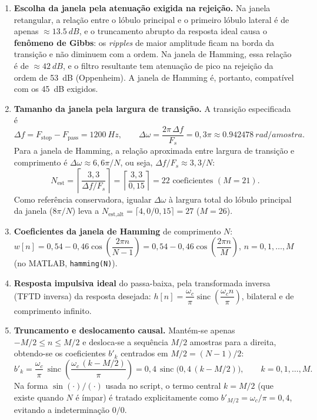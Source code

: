 \documentclass[11pt,a4paper]{article}
\newcommand{\sinc}{\operatorname{sinc}}
\begin{document}
\begin{enumerate}[leftmargin=1.6em, itemsep=2pt, topsep=3pt]
    \item \textbf{Escolha da janela pela atenuação exigida na rejeição.} Na janela retangular, a relação entre o lóbulo principal e o primeiro lóbulo lateral é de apenas $\approx\SI{13,5}{dB}$, e o truncamento abrupto da resposta ideal causa o \textbf{fenômeno de Gibbs}: os \textit{ripples} de maior amplitude ficam na borda da transição e não diminuem com a ordem. Na janela de Hamming, essa relação é de $\approx\SI{42}{dB}$, e o filtro resultante tem atenuação de pico na rejeição da ordem de \SI{53}{dB} (Oppenheim). A janela de Hamming é, portanto, compatível com os \SI{45}{dB} exigidos.

    \item \textbf{Tamanho da janela pela largura de transição.} A transição especificada é
    \begin{equation}
        \Delta f = F_{\text{stop}} - F_{\text{pass}} = \SI{1200}{Hz}, \qquad \Delta\omega = \frac{2\pi\,\Delta f}{F_s} = 0,3\pi \approx \SI{0,942478}{rad/amostra}.
    \end{equation}
    Para a janela de Hamming, a relação aproximada entre largura de transição e comprimento é $\Delta\omega \approx 6,6\pi/N$, ou seja, $\Delta f/F_s \approx 3,3/N$:
    \begin{equation}
        N_{\text{est}} = \left\lceil \frac{3,3}{\Delta f / F_s} \right\rceil = \left\lceil \frac{3,3}{0,15} \right\rceil = 22 \text{ coeficientes } (M = 21).
    \end{equation}
    Como referência conservadora, igualar $\Delta\omega$ à largura total do lóbulo principal da janela ($8\pi/N$) leva a $N_{\text{est,alt}} = \lceil 4,0/0,15 \rceil = 27$ ($M = 26$).

    \item \textbf{Coeficientes da janela de Hamming} de comprimento $N$: $w[n] = 0,54 - 0,46\cos\!\left(\dfrac{2\pi n}{N-1}\right) = 0,54 - 0,46\cos\!\left(\dfrac{2\pi n}{M}\right)$, $n = 0, 1, \dots, M$ (no MATLAB, \texttt{hamming(N)}).

    \item \textbf{Resposta impulsiva ideal} do passa-baixa, pela transformada inversa (TFTD inversa) da resposta desejada: $h[n] = \dfrac{\omega_c}{\pi}\sinc\!\left(\dfrac{\omega_c n}{\pi}\right)$, bilateral e de comprimento infinito.

    \item[5--6.] \textbf{Truncamento e deslocamento causal.} Mantém-se apenas $-M/2 \le n \le M/2$ e desloca-se a sequência $M/2$ amostras para a direita, obtendo-se os coeficientes $b'_k$ centrados em $M/2 = (N-1)/2$:
    \begin{equation}
        b'_k = \frac{\omega_c}{\pi}\,\sinc\!\left(\frac{\omega_c\,(k - M/2)}{\pi}\right) = 0,4\,\sinc\big(0,4\,(k - M/2)\big), \qquad k = 0, 1, \dots, M.
        \label{eq:hideal}
    \end{equation}
    Na forma $\sin(\cdot)/(\cdot)$ usada no script, o termo central $k = M/2$ (que existe quando $N$ é ímpar) é tratado explicitamente como $b'_{M/2} = \omega_c/\pi = 0,4$, evitando a indeterminação $0/0$.


\end{enumerate}
\end{document}
